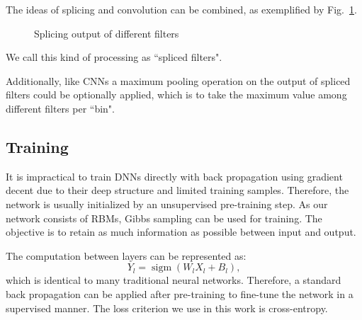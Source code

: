 \documentclass{article}
\DeclareMathOperator*{\sigm}{sigm}
\begin{document}
The ideas of splicing and convolution can be combined, as exemplified by Fig.~\ref{fig:filtersplice}.
\begin{figure}
 \centerline{}
 \caption{Splicing output of different filters}
 \label{fig:filtersplice}
\end{figure}
We call this kind of processing as ``spliced filters".

Additionally, like CNNs a maximum pooling operation on the output of spliced filters could be optionally applied, which is to take the maximum value among different filters per ``bin". 
 
\subsection{Training}\label{sec:train}
It is impractical to train DNNs directly with back propagation using gradient decent due to their deep structure and limited training samples. Therefore, the network is usually initialized by an unsupervised pre-training step. As our network consists of RBMs, Gibbs sampling can be used for training. The objective is to retain as much information as possible between input and output. 

The computation between layers can be represented as:
\begin{equation}\label{dbn}
Y_{l} = \sigm(W_{l}X_{l} + B_{l}) ,
\end{equation}  
which is identical to many traditional neural networks. Therefore, a standard back propagation can be applied after pre-training to fine-tune the network in a supervised manner. The loss criterion we use in this work is cross-entropy.  
\end{document}

